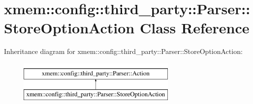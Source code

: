 \hypertarget{classxmem_1_1config_1_1third__party_1_1_parser_1_1_store_option_action}{}\section{xmem\+:\+:config\+:\+:third\+\_\+party\+:\+:Parser\+:\+:Store\+Option\+Action Class Reference}
\label{classxmem_1_1config_1_1third__party_1_1_parser_1_1_store_option_action}
Inheritance diagram for xmem\+:\+:config\+:\+:third\+\_\+party\+:\+:Parser\+:\+:Store\+Option\+Action\+:\begin{figure}[H]
\begin{center}
\leavevmode
\includegraphics[height=2.000000cm]{classxmem_1_1config_1_1third__party_1_1_parser_1_1_store_option_action}
\end{center}
\end{figure}

